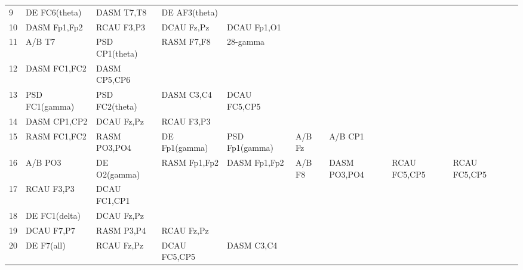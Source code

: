 \begin{landscape}
\begin{table}[]
\begin{tabular}{l|llllllll}
9        & DE FC6(theta)  & DASM T7,T8     & DE AF3(theta)  &                &                &                &               &                &               &               \\
10       & DASM Fp1,Fp2   & RCAU F3,P3     & DCAU Fz,Pz     & DCAU Fp1,O1    &                &                &               &                &               &               \\
11       & A/B T7         & PSD CP1(theta) & RASM F7,F8     & 28-gamma       &                &                &               &                &               &               \\
12       & DASM FC1,FC2   & DASM CP5,CP6   &                &                &                &                &               &                &               &               \\
13       & PSD FC1(gamma) & PSD FC2(theta) & DASM C3,C4     & DCAU FC5,CP5   &                &                &               &                &               &               \\
14       & DASM CP1,CP2   & DCAU Fz,Pz     & RCAU F3,P3     &                &                &                &               &                &               &               \\
15       & RASM FC1,FC2   & RASM PO3,PO4   & DE Fp1(gamma)  & PSD Fp1(gamma) & A/B Fz         & A/B CP1        &               &                &               &               \\
16       & A/B PO3        & DE O2(gamma)   & RASM Fp1,Fp2   & DASM Fp1,Fp2   & A/B F8         & DASM PO3,PO4   & RCAU FC5,CP5  & RCAU FC5,CP5   &               &               \\
17       & RCAU F3,P3     & DCAU FC1,CP1   &                &                &                &                &               &                &               &               \\
18       & DE FC1(delta)  & DCAU Fz,Pz     &                &                &                &                &               &                &               &               \\
19       & DCAU F7,P7     & RASM P3,P4     & RCAU Fz,Pz     &                &                &                &               &                &               &               \\
20       & DE F7(all)     & RCAU Fz,Pz     & DCAU FC5,CP5   & DASM C3,C4     &                &                &               &                &               &               \\

\end{tabular}
\end{table}
\end{landscape}
